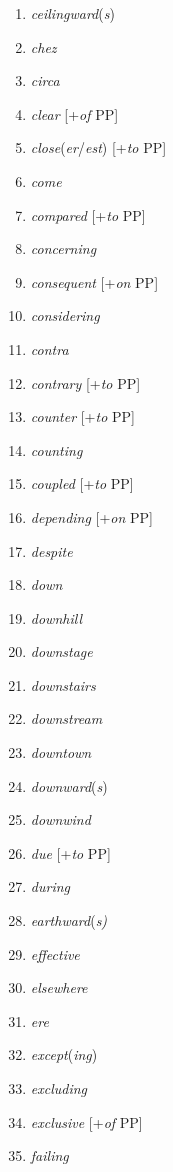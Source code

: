 \begin{multicols}{3}
\begin{enumerate}[noitemsep]
    \item \textit{ceilingward}(\textit{s})
    \item \textit{chez}
    \item \textit{circa}
    \item \textit{clear} [+\textit{of} PP]
    \item \textit{close}(\textit{er}/\textit{est}) [+\textit{to} PP]
    \item \textit{come}
    \item \textit{compared} [+\textit{to} PP]
    \item \textit{concerning}
    \item \textit{consequent} [+\textit{on} PP]
    \item \textit{considering}
    \item \textit{contra}
    \item \textit{contrary} [+\textit{to} PP]
    \item \textit{counter} [+\textit{to} PP]
    \item \textit{counting}
    \item \textit{coupled} [+\textit{to} PP]
    \item \textit{depending}  [+\textit{on} PP]
    \item \textit{despite}
    \item \textit{down}
    \item \textit{downhill}
    \item \textit{downstage}
    \item \textit{downstairs}
    \item \textit{downstream}
    \item \textit{downtown}
    \item \textit{downward}(\textit{s})
    \item \textit{downwind}
    \item \textit{due} [+\textit{to} PP]
    \item \textit{during}
    \item \textit{earthward}(\textit{s)}
    \item \textit{effective}
    \item \textit{elsewhere}
    \item \textit{ere}
    \item \textit{except}(\textit{ing})
    \item \textit{excluding}
    \item \textit{exclusive} [+\textit{of} PP]
    \item \textit{failing}

\end{enumerate}
\end{multicols}
